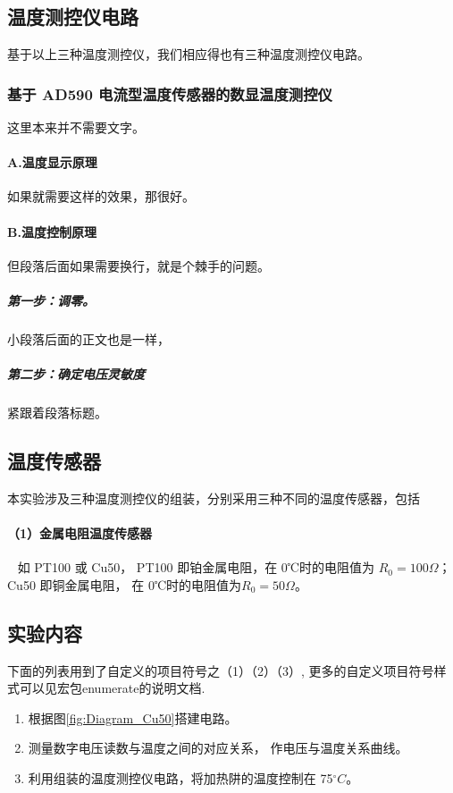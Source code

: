 \documentclass[10pt,a4paper,twocolumn,twoside,UTF8]{ctexart}
\begin{document}
	\subsection{温度测控仪电路}
	基于以上三种温度测控仪，我们相应得也有三种温度测控仪电路。
	\subsubsection{基于 AD590 电流型温度传感器的数显温度测控仪}
	这里本来并不需要文字。
	\paragraph{A.温度显示原理}
	如果就需要这样的效果，那很好。
	\paragraph{B.温度控制原理}但段落后面如果需要换行，就是个棘手的问题。
	\subparagraph{第一步：调零。}小段落后面的正文也是一样，
	\subparagraph{第二步：确定电压灵敏度}
	紧跟着段落标题。


	\subsection{温度传感器}
	本实验涉及三种温度测控仪的组装，分别采用三种不同的温度传感器，包括
	\paragraph{（1）金属电阻温度传感器}~
	\newline %
	\indent 如 PT100 或 Cu50， PT100 即铂金属电阻，在 0℃时的电阻值为 $R_0=100\Omega$； Cu50 即铜金属电阻， 在 0℃时的电阻值为$R_0=50\Omega$。


	\subsection{实验内容}
	下面的列表用到了自定义的项目符号之（1）（2）（3）, 更多的自定义项目符号样式可以见宏包enumerate的说明文档.
	\begin{enumerate}[(1)]
		\item 根据图\ref{fig:Diagram_Cu50}搭建电路。
		\item 测量数字电压读数与温度之间的对应关系， 作电压与温度关系曲线。
	 	\item 利用组装的温度测控仪电路，将加热阱的温度控制在 75$^{\circ}C$。
	\end{enumerate}
\end{document}
